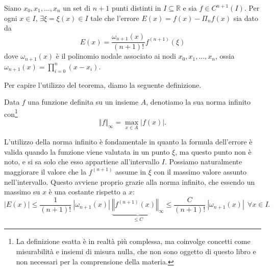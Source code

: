 \begin{theorem}
Siano $x_{0} ,x_{1} ,\dotsc ,x_{n}$ un set di $n+1$ punti distinti in $I\subseteq \mathbb{R}$ e sia $f\in C^{n+1}(I)$. Per ogni $x\in I$, $\exists \xi = \xi(x)\in I$ tale che l'errore $E(x) =f(x) -\Pi _{n} f(x)$ sia dato da
\begin{equation*}
E(x) =\frac{\omega _{n+1}(x)}{( n+1) !} f^{( n+1)}( \xi )
\end{equation*}
dove $\omega _{n+1}(x)$ è il polinomio nodale associato ai nodi $x_{0} ,x_{1} ,\dotsc ,x_{n}$, ossia $\omega _{n+1}(x) =\prod ^{n}_{i=0}( x-x_{i})$.
\end{theorem}

Per capire l'utilizzo del teorema, diamo la seguente definizione.
\begin{definition}
	Data $f$ una funzione definita su un insieme $A$, denotiamo la sua norma infinito con\footnote{La definizione esatta è in realtà più complessa, ma coinvolge concetti come misurabilità e insiemi di misura nulla, che non sono oggetto di questo libro e non necessari per la comprensione della materia.}
	\begin{equation*}
		\Vert f\Vert _{\infty} =\max_{x\in A} \left|f(x)\right|.
	\end{equation*}
\end{definition}

L'utilizzo della norma infinito è fondamentale in quanto la formula dell'errore è valida quando la funzione viene valutata in un punto $\xi$, ma questo punto non è noto, e si sa solo che esso appartiene all'intervallo $I$.
Possiamo naturalmente maggiorare il valore che la $f^{(n+1)}$ assume in $\xi$ con il massimo valore assunto nell'intervallo. Questo avviene proprio grazie alla norma infinito, che essendo un massimo su $x$ è una costante rispetto a $x$:
\begin{equation*}
| E(x)| \leqslant \frac{1}{( n+1) !} \ | \omega _{n+1}(x)| \ \underbrace{\left\Vert f^{( n+1)}(x)\right\Vert _{\infty }}_{\leqslant C} \leqslant \frac{C}{( n+1) !} \ | \omega _{n+1}(x)|\ \ \forall x\in I.
\end{equation*}

